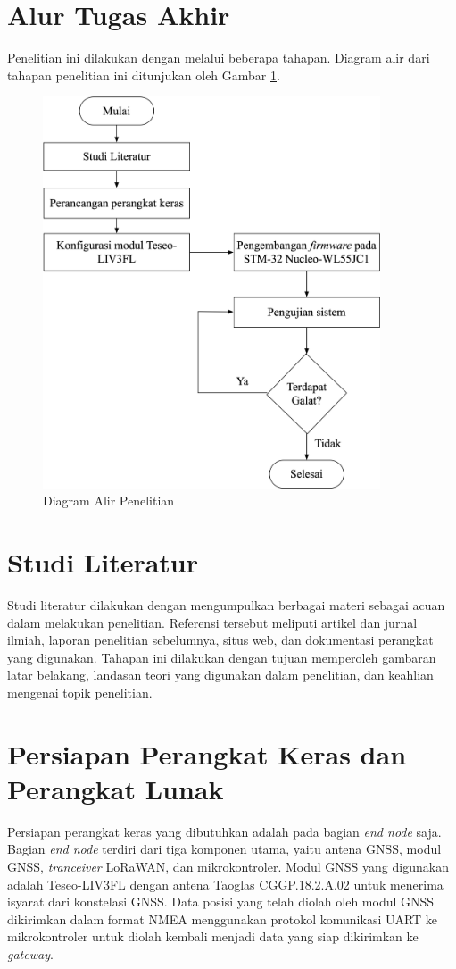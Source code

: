\section{Alur Tugas Akhir}
Penelitian ini dilakukan dengan melalui beberapa tahapan. Diagram alir dari tahapan penelitian ini ditunjukan oleh Gambar \ref{Fig: diagram-alir-penelitian}.
\begin{figure}[H]
	\centering
	\includegraphics[width=10cm]{contents/chapter-3/diagram-alir-penelitian.png}
	\caption{Diagram Alir Penelitian}
	\label{Fig: diagram-alir-penelitian}
\end{figure}

\section{Studi Literatur}
Studi literatur dilakukan dengan mengumpulkan berbagai materi sebagai acuan dalam melakukan penelitian. Referensi tersebut meliputi artikel dan jurnal ilmiah, laporan penelitian sebelumnya, situs web, dan dokumentasi perangkat yang digunakan. Tahapan ini dilakukan dengan tujuan memperoleh gambaran latar belakang, landasan teori yang digunakan dalam penelitian, dan keahlian	 mengenai topik penelitian.

\section{Persiapan Perangkat Keras dan Perangkat Lunak}
Persiapan perangkat keras yang dibutuhkan adalah pada bagian \textit{end node} saja. Bagian \textit{end node} terdiri dari tiga komponen utama, yaitu antena GNSS, modul GNSS, \textit{tranceiver} LoRaWAN, dan mikrokontroler. Modul GNSS yang digunakan adalah Teseo-LIV3FL dengan antena Taoglas CGGP.18.2.A.02 untuk menerima isyarat dari konstelasi GNSS. Data posisi yang telah diolah oleh modul GNSS dikirimkan dalam format NMEA menggunakan protokol komunikasi UART ke mikrokontroler untuk diolah kembali menjadi data yang siap dikirimkan ke \textit{gateway}. 

